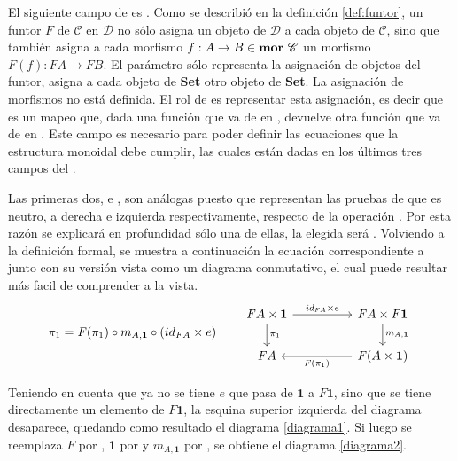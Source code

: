 El siguiente campo de  es . Como se describió en la definición \ref{def:funtor}, un funtor $\mathit{F}$ de $\mathscr{C}$ en $\mathscr{D}$ no sólo asigna un objeto de $\mathscr{D}$ a cada objeto de $\mathscr{C}$, sino que también asigna a cada morfismo $f : A \rightarrow B \in \text{\bf mor} \ \mathscr{C}$ un morfismo $\mathit{F}(f) : \mathit{F} A \rightarrow \mathit{F} B$. El parámetro  sólo representa la asignación de objetos del funtor, asigna a cada objeto de \textbf{Set} otro objeto de \textbf{Set}. La asignación de morfismos no está definida. El rol de  es representar esta asignación, es decir que es un mapeo que, dada una función que va de  en , devuelve otra función que va de  en . Este campo es necesario para poder definir las ecuaciones que la estructura monoidal debe cumplir, las cuales están dadas en los últimos tres campos del .

Las primeras dos,  e , son análogas puesto que representan las pruebas de que  es neutro, a derecha e izquierda respectivamente, respecto de la operación . Por esta razón se explicará en profundidad sólo una de ellas, la elegida será . Volviendo a la definición formal, se muestra a continuación la ecuación correspondiente a  junto con su versión vista como un diagrama conmutativo, el cual puede resultar más facil de comprender a la vista.
\begin{equation*}
\pi_1 = \mathit{F}(\pi_1) \circ m_{A,\mathbf{1}} \circ (id_{\mathit{F}A} \times e) 
\qquad 
\begin{tikzcd}[column sep = huge]
\mathit{F} A \times \mathbf{1} \arrow[d, "\pi_1"] \arrow[r, "id_{\mathit{F} A} \times e"] & \mathit{F} A \times \mathit{F} \mathbf{1} \arrow[d, "m_{A,\mathbf{1}}"]  \\
\mathit{F} A & \mathit{F} (A \times \mathbf{1}) \arrow[l, "\mathit{F}(\pi_1)"]
\end{tikzcd}
\end{equation*}

Teniendo en cuenta que ya no se tiene $e$ que pasa de $\mathbf{1}$ a $\mathit{F} \mathbf{1}$, sino que se tiene directamente un elemento de $\mathit{F} \mathbf{1}$, la esquina superior izquierda del diagrama desaparece, quedando como resultado el diagrama \ref{diagrama1}. Si luego se reemplaza $\mathit{F}$ por , $\mathbf{1}$ por \AgdaDatatype{$\top$} y $m_{A,\mathbf{1}}$ por , se obtiene el diagrama \ref{diagrama2}. 
\vspace{-1.25\baselineskip}

